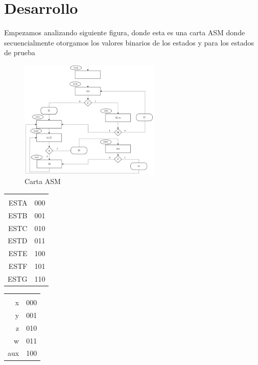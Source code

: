 \documentclass[table]{scrartcl}
\begin{document}
\section{Desarrollo}
\label{sec:orgac7043c}
Empezamos analizando siguiente figura, donde esta es una carta ASM
donde secuencialmente otorgamos los valores binarios de los estados y para
los estados de prueba
\begin{figure}[htbp]
  \centering
  \includegraphics[width=0.6\textwidth]{./img/2.png}
  \caption{\label{fig:2}Carta ASM}
\end{figure}
\begin{center}
    \label{tab:1}
  \begin{tabular}{rl}
    \multicolumn{2}{c}{\cellcolor[HTML]{EA4335}{\color[HTML]{FFFFFF} \textbf{Entradas}}} \\
    ESTA & 000 \\
    ESTB & 001 \\
    ESTC & 010 \\
    ESTD & 011 \\
    ESTE & 100 \\
    ESTF & 101 \\
    ESTG & 110
\end{tabular}
\end{center}
\begin{center}
  \label{tab:2}
  \begin{tabular}{rl}
    \multicolumn{2}{c}{\cellcolor[HTML]{EA4335}{\color[HTML]{FFFFFF} \textbf{Prueba}}} \\
    x & 000 \\
    y & 001 \\
    z & 010 \\
    w & 011 \\
    aux & 100
  \end{tabular}
\end{center}
\end{document}
